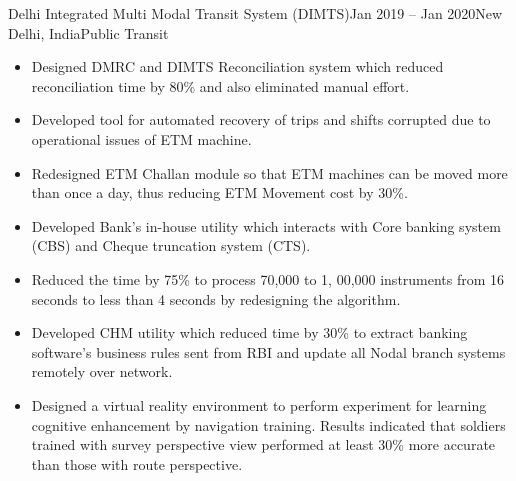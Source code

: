 \documentclass[10pt,a4paper,ragged2e]{altacv}
\begin{document}
{Delhi Integrated Multi Modal Transit System (DIMTS)}{Jan 2019 -- Jan 2020}{New Delhi, India}{Public Transit}
\begin{itemize}
\item Designed DMRC and DIMTS Reconciliation system which reduced reconciliation time by 80\% and also eliminated manual effort.
\item Developed tool for automated recovery of trips and shifts corrupted due to operational issues of ETM machine.
\item Redesigned ETM Challan module so that ETM machines can be moved more than once a day, thus reducing ETM Movement cost by 30\%.
\end{itemize}
\divider

\begin{itemize}
\item Developed Bank’s in-house utility which interacts with Core banking system (CBS) and Cheque truncation system (CTS).
\item Reduced the time by 75\% to process 70,000 to 1, 00,000 instruments from 16 seconds to less than 4 seconds by redesigning the algorithm.
\item Developed CHM utility which reduced time by 30\% to extract banking software's business rules sent from RBI and update all Nodal branch systems remotely over network.
\end{itemize}
\divider

\begin{itemize}
\item Designed a virtual reality environment to perform experiment for learning cognitive enhancement by navigation training. Results indicated that soldiers trained with survey perspective view performed at least 30\% more accurate than those with route perspective.
\end{itemize}

\clearpage

% 
% 
% 
% 
% 
% 
% 
\end{document}
